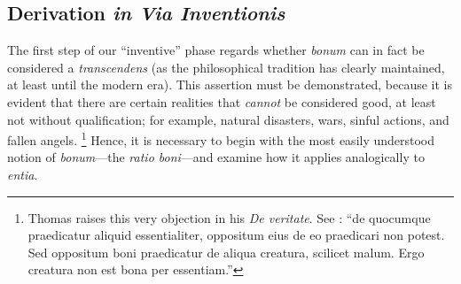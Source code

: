 \subsection{Derivation \emph{in Via Inventionis}}

The first step of our “inventive” phase regards whether \emph{bonum} can in fact be considered a \emph{transcendens} (as the philosophical tradition has clearly maintained, at least until the modern era). This assertion must be demonstrated, because it is evident that there are certain realities that \emph{cannot} be considered good, at least not without qualification; for example, natural disasters, wars, sinful actions, and fallen angels.%
%
\footnote{Thomas raises this very objection in his \emph{De veritate}. See \cite[q.~21, a.~5, arg.~3.]{st:deveritate}: “de quocumque praedicatur aliquid essentialiter, oppositum eius de eo praedicari non potest. Sed oppositum boni praedicatur de aliqua creatura, scilicet malum. Ergo creatura non est bona per essentiam.”} Hence, it is necessary to begin with the most easily understood notion of \emph{bonum}—the \emph{ratio boni}—and examine how it applies analogically to \emph{entia}.


